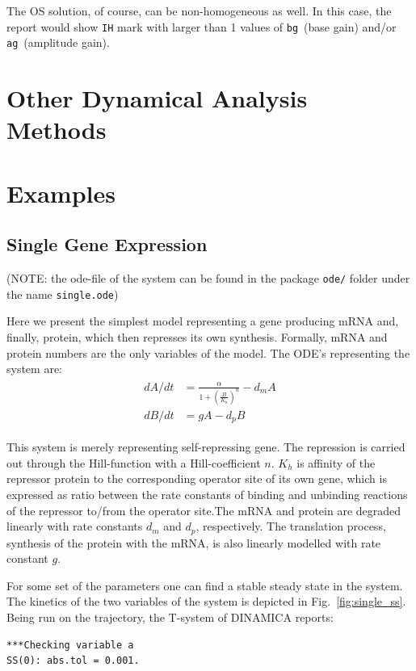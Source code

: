 \documentclass[11pt,a4paper]{article}
\begin{document}
The OS solution, of course, can be non-homogeneous as well. In this case, the report
would show \texttt{IH} mark with larger than 1 values of \texttt{bg}~(base gain) and/or
\texttt{ag}~(amplitude gain). 



\section{Other Dynamical Analysis Methods}
\label{sec:other-dynam-analys}




\section{Examples}
\label{sec:examples}

\subsection{Single Gene Expression}
\label{sec:single-gene-expr}

(NOTE: the ode-file of the system can be found in the package \texttt{ode/} folder
under the name \texttt{single.ode})

Here we present the simplest model representing a gene producing mRNA and, finally,
protein, which then represses its own synthesis. Formally, mRNA and protein numbers
are the only variables of the model. The ODE's representing the system are:
\begin{align}
  \label{eq:1}
  \begin{split}
    dA/dt &= \frac{\alpha}{1+\left(\frac{B}{K_h}\right)^n}-d_mA\\
    dB/dt &= gA - d_pB
  \end{split}
\end{align}


This system is merely representing self-repressing gene. The repression is carried
out through the Hill-function with a Hill-coefficient $n$. $K_h$ is affinity of the
repressor protein to the corresponding operator site of its own gene, which is
expressed as ratio between the rate constants of binding and unbinding reactions of
the repressor to/from the operator site.The mRNA and protein are degraded linearly
with rate constants $d_m$ and $d_p$, respectively. The translation process, synthesis
of the protein with the mRNA, is also linearly modelled with rate constant $g$.

For some set of the parameters one can find a stable steady state in the system. The
kinetics of the two variables of the system is depicted in Fig.~\ref{fig:single_ss}.
Being run on the trajectory, the T-system of DINAMICA reports:
\begin{verbatim}
***Checking variable a
SS(0): abs.tol = 0.001.
\end{verbatim}
\end{document}

